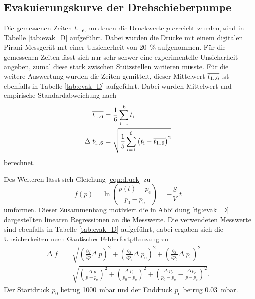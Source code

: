 \subsection{Evakuierungskurve der Drehschieberpumpe}
\label{sec:AuswEvaD}

Die gemessenen Zeiten $t_\text{1..6}$, an denen die Druckwerte $p$ erreicht
wurden, sind in Tabelle \ref{tab:evak_D} aufgeführt. Dabei wurden die Drücke
mit einem digitalen Pirani Messgerät mit einer
Unsicherheit von \SI{20}{\percent} aufgenommen. Für die gemessenen Zeiten lässt
sich nur sehr schwer eine experimentelle Unsicherheit angeben, zumal diese stark
zwischen Stützstellen variieren müsste. Für die weitere Auswertung wurden die
Zeiten gemittelt, dieser Mittelwert $\overline{t_\text{1..6}}$ ist ebenfalls in
Tabelle \ref{tab:evak_D} aufgeführt.
Dabei wurden Mittelwert und empirische Standardabweichung nach
\begin{align*}
  \overline{t_\text{1..6}} &= \frac{1}{6} \sum_{i = 1}^6 t_\text{i} \\
  \Delta \; t_\text{1..6} &=
  \sqrt{\frac{1}{5} \sum_{i = 1}^6 \left(t_\text{i} - \overline{t_\text{1..6}}\right)^2}
\end{align*}
berechnet.



Des Weiteren lässt sich Gleichung \eqref{eqn:druck} zu
\begin{equation*}
  f\left(p\right) = \ln\left(\frac{p(t)-p_\text{e}}{p_0-p_\text{e}}\right) =
  - \frac{S}{V} \;t
\end{equation*}
umformen. Dieser Zusammenhang motiviert die in Abbildung \ref{fig:evak_D}
dargestellten linearen Regressionen an die Messwerte. Die verwendeten Messwerte
sind ebenfalls in Tabelle \ref{tab:evak_D} aufgeführt, dabei ergaben sich die
Unsicherheiten nach Gaußscher Fehlerfortpflanzung zu
\begin{align*}
  \Delta \; f &=
  \sqrt{\left(\frac{\partial f}{\partial p} \Delta \; p\right)^2 +
  \left(\frac{\partial f}{\partial p_\text{e}} \Delta \; p_\text{e}\right)^2 +
  \left(\frac{\partial f}{\partial p_\text{0}} \Delta \; p_\text{0}\right)^2} \\
  &=
  \sqrt{\left(\frac{\Delta \; p}{p - p_\text{e}}\right)^2 +
  \left(\frac{\Delta \; p_0}{p_0 - p_\text{e}}\right)^2 +
  \left(\frac{\Delta \; p_\text{e}}{p_0 - p_\text{e}} -
  \frac{\Delta \; p_\text{e}}{p - p_\text{e}}\right)^2}.
\end{align*}
Der Startdruck $p_0$ betrug \SI{1000}{\milli\bar} und der Enddruck $p_\text{e}$
betrug \SI{0.03}{\milli\bar}.

